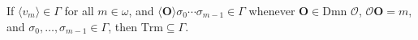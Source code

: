 If $\langle v_m \rangle \in \Gamma$ for all $m \in \omega$, and $\langle \mathbf{O} \rangle \sigma_0 \cdots \sigma_{m-1} \in \Gamma$ whenever $\mathbf{O} \in \text{Dmn } \mathcal{O}$, $\mathcal{O}\mathbf{O} = m$, and $\sigma_0, \ldots, \sigma_{m-1} \in \Gamma$, then $\text{Trm} \subseteq \Gamma$.
